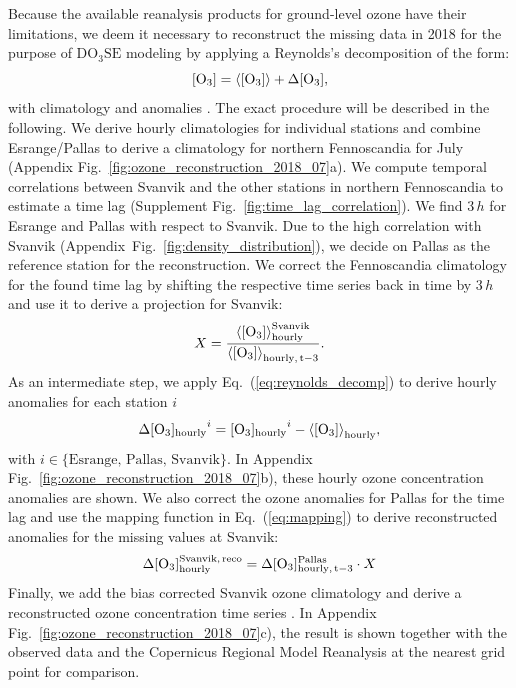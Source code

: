 \documentclass[bg, manuscript]{copernicus}
\begin{document}
Because the available reanalysis products for ground-level ozone have their limitations, we deem it necessary to reconstruct the missing data in 2018 for the purpose of $\mathrm{DO_3SE}$ modeling by applying a Reynolds's decomposition of the form:
\begin{equation}
  \chem{[O_3]} = \chem{\left<[O_3]\right>} + \chem{\Delta[O_3]},
  \label{eq:reynolds_decomp}
\end{equation}
with climatology \chem{\left<[O_3]\right>} and anomalies \chem{\Delta[O_3]}.
The exact procedure will be described in the following.
We derive hourly climatologies for individual stations and combine Esrange/Pallas to derive a climatology for northern Fennoscandia for July (Appendix Fig.~\ref{fig:ozone_reconstruction_2018_07}a). We compute temporal correlations between Svanvik and the other stations in northern Fennoscandia to estimate a time lag (Supplement Fig.~\ref{fig:time_lag_correlation}). We find $3\,\unit{h}$ for Esrange and Pallas with respect to Svanvik. Due to the high correlation with Svanvik (Appendix~Fig.~\ref{fig:density_distribution}), we decide on Pallas as the reference station for the reconstruction. We correct the Fennoscandia climatology for the found time lag  by shifting the respective time series back in time by $3\,\unit{h}$ and use it to derive a projection for Svanvik:
\begin{equation}
  X = \frac{\chem{\left<[O_3]\right>_{hourly}^{Svanvik}}}{\chem{\left<[O_3]\right>_{hourly,\,t-3}}}.
  \label{eq:mapping}
\end{equation}
As an intermediate step, we apply Eq.~(\ref{eq:reynolds_decomp}) to derive hourly anomalies for each station $i$
\begin{equation}
  \chem{\Delta[O_3]_{hourly}}^i = \chem{[O_3]_{hourly}}^i-\chem{\left<[O_3]\right>_{hourly}},
\end{equation}
with $i \in \{\text{Esrange, Pallas, Svanvik\}}$.
In Appendix Fig.~\ref{fig:ozone_reconstruction_2018_07}b), these hourly ozone concentration anomalies are shown. We also correct the ozone anomalies for Pallas for the time lag  and use the mapping function in Eq.~(\ref{eq:mapping}) to derive reconstructed anomalies for the missing values at Svanvik:
\begin{equation}
    \chem{\Delta [O_3]_{hourly}^{Svanvik,\,reco}} = \chem{\Delta[O_3]_{hourly,\,t-3}^{Pallas}} \cdot X
\end{equation}
Finally, we add the bias corrected Svanvik ozone climatology and derive a reconstructed ozone concentration time series . In Appendix Fig.~\ref{fig:ozone_reconstruction_2018_07}c), the result is shown together with the observed data and the Copernicus Regional Model Reanalysis at the nearest grid point for comparison.
\end{document}

